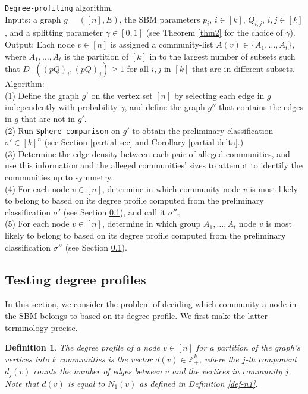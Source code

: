 \documentclass[11pt]{article}
\newcommand{\dd}{D_+}
\newcommand{\mZ}{\mathbb{Z}}
\newcommand{\1}{\mathbb{1}}
\newtheorem{definition}{Definition}
\begin{document}
{\tt Degree-profiling} algorithm. \\
Inputs: a graph $g=([n],E)$, the SBM parameters $p_i$, $i \in [k]$, $Q_{i,j}$, $i,j \in [k]$, and a splitting parameter $\gamma \in [0,1]$ (see Theorem \ref{thm2} for the choice of $\gamma$).\\
Output: Each node $v \in [n]$ is assigned a community-list $A(v) \in \{A_1,\dots,A_t\}$, where $A_1,\dots,A_t$ is the partition of $[k]$ in to the largest number of subsets such that $\dd((pQ)_i,(pQ)_j) \geq 1$ for all $i,j$ in $[k]$ that are in different subsets.\\
Algorithm:\\
(1) Define the graph $g'$ on the vertex set $[n]$ by selecting each edge in $g$ independently with probability $\gamma$, and define the graph $g''$ that contains the edges in $g$ that are not in $g'$. \\
(2) Run {\tt Sphere-comparison} on $g'$ to obtain the preliminary classification $\sigma' \in [k]^n$ (see Section \ref{partial-sec} and Corollary \ref{partial-delta}.) \\
(3) Determine the edge density between each pair of alleged communities, and use this information and the alleged communities' sizes to attempt to identify the communities up to symmetry.\\
(4) For each node $v \in [n]$, determine in which community node $v$ is most likely to belong to based on its degree profile computed from the preliminary classification $\sigma'$ (see Section \ref{testing}), and call it $\sigma''_v$\\
(5) For each node $v \in [n]$, determine in which group $A_1,\dots,A_t$ node $v$ is most likely to belong to based on its degree profile computed from the preliminary classification $\sigma''$ (see Section \ref{testing}). 

\subsection{Testing degree profiles}\label{testing}
In this section, we consider the problem of deciding which community a node in the SBM belongs to based on its degree profile. We first make the latter terminology precise. 
\begin{definition}
The degree profile of a node $v \in [n]$ for a partition of the graph's vertices into $k$ communities is the vector $d(v) \in \mZ_+^k$, where the $j$-th component $d_j(v)$ counts the number of edges between $v$ and the vertices in community $j$.  Note that $d(v)$ is equal to $N_1(v)$ as defined in Definition \ref{def-n1}.
\end{definition}
\end{document}
